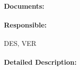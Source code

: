 \paragraph{Documents:}
\label{sec:sw-comp-documents}
\tbc

\paragraph{Responsible:}
\label{sec:sw-comp-responsible}
DES, VER

\paragraph{Detailed Description:}
\label{sec:sw-comp-deta-descr}

\tbc


%
%
%
%
%



